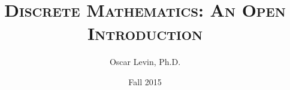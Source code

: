 \def\course{Math 228}




\title{\textsc{Discrete Mathematics: An Open Introduction}
}




\author{Oscar Levin, Ph.D.}

\date{Fall 2015}

\begin{titlingpage}

\maketitle

\end{titlingpage}


  

\tableofcontents


